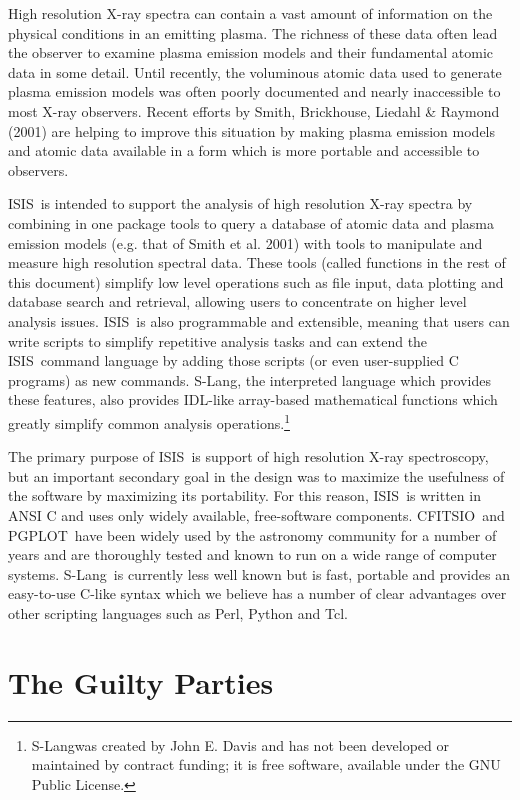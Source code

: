 \documentclass{book}
\newcommand{\isisx}{{\sc ISIS~}}
\newcommand{\cfitsio}{{\sc CFITSIO}}
\newcommand{\pgplot}{{\sc PGPLOT}}
\newcommand{\slang}{{\sc S-Lang}}
\begin{document}
High resolution X-ray spectra can contain a vast amount of information on
the physical conditions in an emitting plasma.  The richness of these data
often lead the observer to examine plasma emission models and their
fundamental atomic data in some detail.  Until recently, the voluminous
atomic data used to generate plasma emission models was often poorly
documented and nearly inaccessible to most X-ray observers. Recent efforts
by Smith, Brickhouse, Liedahl \& Raymond (2001) are helping to improve this
situation by making plasma emission models and atomic data available in a
form which is more portable and accessible to observers.

\isisx is intended to support the analysis of high resolution
X-ray spectra by combining in one package tools to query a
database of atomic data and plasma emission models (e.g. that of
Smith et al. 2001) with tools to manipulate and measure high
resolution spectral data. These tools (called functions in the
rest of this document) simplify low level operations such as file
input, data plotting and database search and retrieval, allowing
users to concentrate on higher level analysis issues. \isisx is
also programmable and extensible, meaning that users can write
scripts to simplify repetitive analysis tasks and can extend the
\isisx command language by adding those scripts (or even
user-supplied C programs) as new commands.  \slang, the
interpreted language which provides these features, also provides
IDL-like array-based mathematical functions which greatly simplify
common analysis operations.\footnote{\slang was created by John E.
Davis and has not been developed or maintained by contract
funding; it is free software, available under the GNU Public
License.}

The primary purpose of \isisx is support of high resolution X-ray
spectroscopy, but an important secondary goal in the design was to
maximize the usefulness of the software by maximizing its
portability.  For this reason, \isisx is written in ANSI C and
uses only widely available, free-software components.  \cfitsio\
and \pgplot\ have been widely used by the astronomy community for
a number of years and are thoroughly tested and known to run on a
wide range of computer systems.  \slang\ is currently less well
known but is fast, portable and provides an easy-to-use C-like
syntax which we believe has a number of clear advantages over
other scripting languages such as Perl, Python and Tcl.

\vfill

\section{The Guilty Parties}
\end{document}
